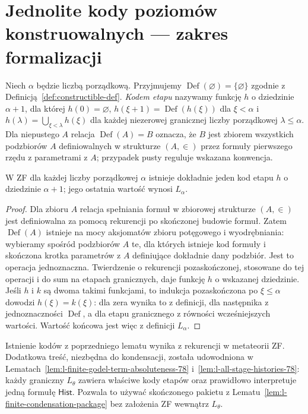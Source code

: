 \section{Jednolite kody poziomów konstruowalnych — zakres formalizacji}
\label{sec:l-uniform-codes-32}
\begin{definicja}
\label{def:l-stage-code-32}
Niech $\alpha$ będzie liczbą porządkową. Przyjmujemy
$\operatorname{Def}(\varnothing)=\{\varnothing\}$
zgodnie z Definicją~\ref{def:constructible-def}. \emph{Kodem etapu} nazywamy funkcję $h$ o dziedzinie $\alpha+1$, dla której $h(0)=\varnothing$, $h(\xi+1)=\operatorname{Def}(h(\xi))$ dla $\xi<\alpha$ i $h(\lambda)=\bigcup_{\xi<\lambda}h(\xi)$ dla każdej niezerowej granicznej liczby porządkowej $\lambda\leq\alpha$. Dla niepustego $A$ relacja $\operatorname{Def}(A)=B$
oznacza, że $B$ jest zbiorem wszystkich podzbiorów $A$
definiowalnych w strukturze $(A,\in)$ przez formuły
pierwszego rzędu z parametrami z $A$; przypadek pusty
reguluje wskazana konwencja.
\end{definicja}
\begin{lemat}
\label{lem:l-stage-code-unique-32}
W ZF dla każdej liczby porządkowej $\alpha$ istnieje dokładnie jeden kod etapu $h$ o dziedzinie $\alpha+1$; jego ostatnia wartość wynosi $L_\alpha$.
\end{lemat}
\begin{proof}
Dla zbioru $A$ relacja spełniania formuł w zbiorowej strukturze $(A,\in)$ jest definiowalna za pomocą rekurencji po skończonej budowie formuł. Zatem $\operatorname{Def}(A)$ istnieje na mocy aksjomatów zbioru potęgowego i wyodrębniania: wybieramy spośród podzbiorów $A$ te, dla których istnieje kod formuły i skończona krotka parametrów z $A$ definiujące dokładnie dany podzbiór. Jest to operacja jednoznaczna. Twierdzenie o rekurencji pozaskończonej, stosowane do tej operacji i do sum na etapach granicznych, daje funkcję $h$ o wskazanej dziedzinie. Jeśli $h$ i $k$ są dwoma takimi funkcjami, to indukcja pozaskończona po $\xi\leq\alpha$ dowodzi $h(\xi)=k(\xi)$: dla zera wynika to z definicji, dla następnika z jednoznaczności $\operatorname{Def}$, a dla etapu granicznego z równości wcześniejszych wartości. Wartość końcowa jest więc z definicji $L_\alpha$.
\end{proof}
\begin{uwaga}
\label{rem:l-stage-internality-open-32}
Istnienie kodów z poprzedniego lematu wynika
z rekurencji w metateorii ZF. Dodatkowa treść,
niezbędna do kondensacji, została udowodniona
w Lematach~\ref{lem:l-finite-godel-term-absoluteness-78}
i~\ref{lem:l-all-stage-histories-78}:
każdy graniczny $L_\theta$ zawiera właściwe
kody etapów oraz prawidłowo interpretuje
jedną formułę $\mathsf{Hist}$. Pozwala to używać
skończonego pakietu z
Lematu~\ref{lem:l-finite-condensation-package}
bez założenia ZF wewnątrz $L_\theta$.
\end{uwaga}